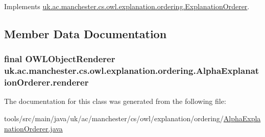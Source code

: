 Implements \hyperlink{interfaceuk_1_1ac_1_1manchester_1_1cs_1_1owl_1_1explanation_1_1ordering_1_1_explanation_orderer_a66b1b088219ba3434a5bd66a193ead40}{uk.\-ac.\-manchester.\-cs.\-owl.\-explanation.\-ordering.\-Explanation\-Orderer}.



\subsection{Member Data Documentation}
\hypertarget{classuk_1_1ac_1_1manchester_1_1cs_1_1owl_1_1explanation_1_1ordering_1_1_alpha_explanation_orderer_ae5937bfb24d2252923a0594b886a3a4f}{
\subsubsection[{renderer}]{\setlength{\rightskip}{0pt plus 5cm}final {\bf O\-W\-L\-Object\-Renderer} uk.\-ac.\-manchester.\-cs.\-owl.\-explanation.\-ordering.\-Alpha\-Explanation\-Orderer.\-renderer\hspace{0.3cm}{\ttfamily [protected]}}}\label{classuk_1_1ac_1_1manchester_1_1cs_1_1owl_1_1explanation_1_1ordering_1_1_alpha_explanation_orderer_ae5937bfb24d2252923a0594b886a3a4f}


The documentation for this class was generated from the following file\-:\begin{DoxyCompactItemize}
\item 
tools/src/main/java/uk/ac/manchester/cs/owl/explanation/ordering/\hyperlink{_alpha_explanation_orderer_8java}{Alpha\-Explanation\-Orderer.\-java}\end{DoxyCompactItemize}
